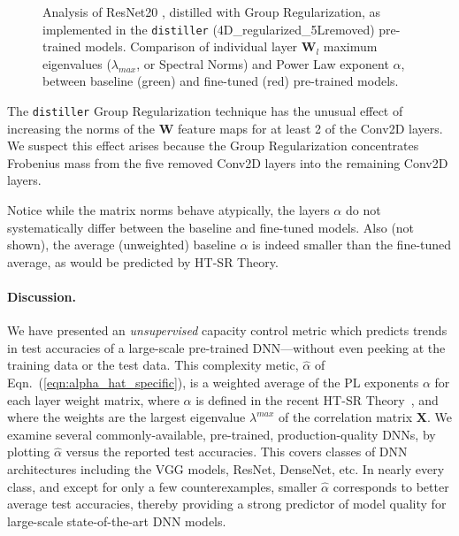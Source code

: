\begin{figure}[H]
{      \label{fig:resnet204Dmaxev}
   }
   \vspace{-3mm}
   \caption{
     Analysis of ResNet20 , distilled with Group Regularization, as implemented in the \texttt{distiller}  (4D\_regularized\_5Lremoved) pre-trained models.  
     Comparison of individual layer $\mathbf{W}_{l}$ maximum eigenvalues ($\lambda_{max}$, or Spectral Norms) and  
     Power Law exponent $\alpha$, between baseline (green) and fine-tuned (red)  pre-trained models.   
           }
   \label{fig:resnet204D5L}
\end{figure}

The \texttt{distiller} Group Regularization technique has the unusual effect of increasing the norms of the $\mathbf{W}$ feature maps for at least 2 of the Conv2D layers.
We suspect this effect arises because the Group Regularization concentrates Frobenius mass from the five removed Conv2D layers into the remaining Conv2D layers.

Notice while the matrix norms behave atypically, the layers $\alpha$ do not systematically differ between the baseline and fine-tuned models.
Also (not shown), the average (unweighted) baseline $\alpha$ is indeed smaller than the fine-tuned average, as would be predicted by HT-SR Theory.

\vspace{-2mm}
\paragraph{Discussion.}

We have presented an \emph{unsupervised} capacity control metric which predicts trends in test accuracies of a large-scale pre-trained DNN---without even peeking at the training data or the test data. 
This complexity metic, $\hat{\alpha}$ of Eqn.~(\ref{eqn:alpha_hat_specific}), is a weighted average of the PL exponents $\alpha$ for each layer weight matrix, where $\alpha$ is defined in the recent HT-SR Theory~\cite{MM18_TR,MM19_HTSR_ICML}, and where the weights are the largest eigenvalue $\lambda^{max}$ of the correlation matrix $\mathbf{X}$.  
%
We examine several commonly-available, pre-trained, production-quality DNNs, by plotting $\hat{\alpha}$ versus the reported test accuracies.
This covers classes of DNN architectures including the VGG models, ResNet, DenseNet, etc. 
In nearly every class, and except for only a few counterexamples, smaller $\hat{\alpha}$ corresponds to better average test accuracies, thereby providing a strong predictor of model quality for large-scale state-of-the-art DNN models.

